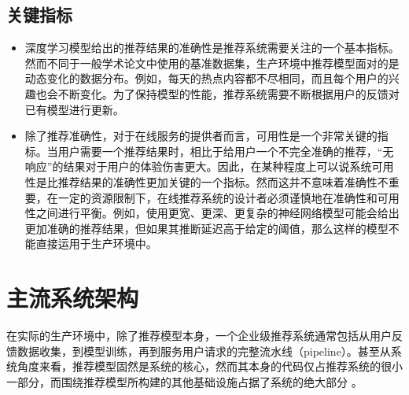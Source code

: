 \documentclass[letterpaper,10pt,english]{sphinxmanual}
\begin{document}
\subsection{关键指标}
\label{\detokenize{chapter_recommender_system/overview:id10}}\begin{itemize}
\item {} 
\sphinxAtStartPar
{}
深度学习模型给出的推荐结果的准确性是推荐系统需要关注的一个基本指标。然而不同于一般学术论文中使用的基准数据集，生产环境中推荐模型面对的是动态变化的数据分布。例如，每天的热点内容都不尽相同，而且每个用户的兴趣也会不断变化。为了保持模型的性能，推荐系统需要不断根据用户的反馈对已有模型进行更新。

\item {} 
\sphinxAtStartPar
{}
除了推荐准确性，对于在线服务的提供者而言，可用性是一个非常关键的指标。当用户需要一个推荐结果时，相比于给用户一个不完全准确的推荐，“无响应”的结果对于用户的体验伤害更大。因此，在某种程度上可以说系统可用性是比推荐结果的准确性更加关键的一个指标。然而这并不意味着准确性不重要，在一定的资源限制下，在线推荐系统的设计者必须谨慎地在准确性和可用性之间进行平衡。例如，使用更宽、更深、更复杂的神经网络模型可能会给出更加准确的推荐结果，但如果其推断延迟高于给定的阈值，那么这样的模型不能直接运用于生产环境中。

\end{itemize}


\section{主流系统架构}
\label{\detokenize{chapter_recommender_system/system_architecture:id1}}\label{\detokenize{chapter_recommender_system/system_architecture::doc}}
\sphinxAtStartPar
在实际的生产环境中，除了推荐模型本身，一个企业级推荐系统通常包括从用户反馈数据收集，到模型训练，再到服务用户请求的完整流水线（pipeline）。甚至从系统角度来看，推荐模型固然是系统的核心，然而其本身的代码仅占推荐系统的很小一部分，而围绕推荐模型所构建的其他基础设施占据了系统的绝大部分
。
\end{document}
